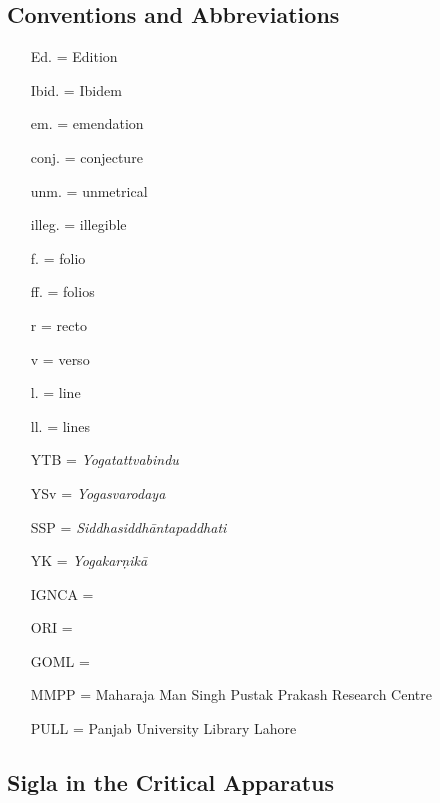 \subsection{Conventions and Abbreviations}
\begin{itemize}
\item[Ed.] = Edition
\item[Ibid.] = Ibidem
\item[em.] = emendation
\item[conj.] = conjecture
\item[unm.] = unmetrical
\item[illeg.] = illegible
\item[f.] = folio
\item[ff.] = folios
\item[r] = recto
\item[v] = verso
\item[l.] = line
\item[ll.] = lines 
\item[YTB] = \emph{Yogatattvabindu} 
\item[YSv] = \emph{Yogasvarodaya}
\item[SSP] = \emph{Siddhasiddhāntapaddhati}
\item[YK] = \emph{Yogakarṇikā}
\item[IGNCA] =
\item[ORI] =
\item[GOML] =
\item[MMPP] = Maharaja Man Singh Pustak Prakash Research Centre
\item[PULL] = Panjab University Library Lahore
    
  
\end{itemize}

\subsection{Sigla in the Critical Apparatus}

